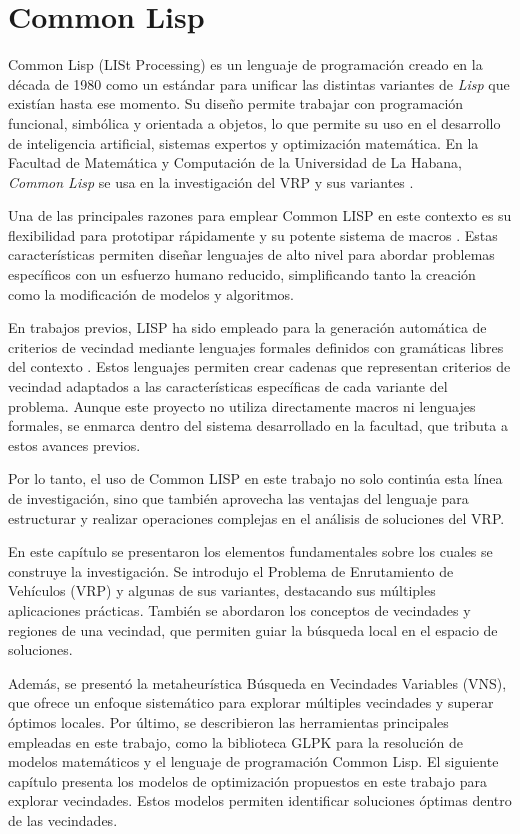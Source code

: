 \documentclass[12pt]{report}
\begin{document}
	\section{Common Lisp}
	\label{sec:lisp}

	Common Lisp (LISt Processing) es un lenguaje de programación creado en la década de 1980 como un estándar para unificar las distintas variantes de \textit{Lisp} que existían hasta ese momento. Su diseño permite trabajar con programación funcional, simbólica y orientada a objetos, lo que permite su uso en el desarrollo de inteligencia artificial, sistemas expertos y optimización matemática. En la Facultad de Matemática y Computación de la Universidad de La Habana, \textit{Common Lisp} se usa en la investigación del VRP y sus variantes \cite{ref3,ref4,ref5,ref6,ref18}.

	Una de las principales razones para emplear Common LISP en este contexto es su flexibilidad para prototipar rápidamente y su potente sistema de macros \cite{ref5}. Estas características permiten diseñar lenguajes de alto nivel para abordar problemas específicos con un esfuerzo humano reducido, simplificando tanto la creación como la modificación de modelos y algoritmos.

	En trabajos previos, LISP ha sido empleado para la generación automática de criterios de vecindad mediante lenguajes formales definidos con gramáticas libres del contexto \cite{ref18}. Estos lenguajes permiten crear cadenas que representan criterios de vecindad adaptados a las características específicas de cada variante del problema. Aunque este proyecto no utiliza directamente macros ni lenguajes formales, se enmarca dentro del sistema desarrollado en la facultad, que tributa a estos avances previos.

	Por lo tanto, el uso de Common LISP en este trabajo no solo continúa esta línea de investigación, sino que también aprovecha las ventajas del lenguaje para estructurar y realizar operaciones complejas en el análisis de soluciones del VRP.

    En este capítulo se presentaron los elementos fundamentales sobre los cuales se construye la investigación. Se introdujo el Problema de Enrutamiento de Vehículos (VRP) y algunas de sus variantes, destacando sus múltiples aplicaciones prácticas. También se abordaron los conceptos de vecindades y regiones de una vecindad, que permiten guiar la búsqueda local en el espacio de soluciones.

    Además, se presentó la metaheurística Búsqueda en Vecindades Variables (VNS), que ofrece un enfoque sistemático para explorar múltiples vecindades y superar óptimos locales. Por último, se describieron las herramientas principales empleadas en este trabajo, como la biblioteca GLPK para la resolución de modelos matemáticos y el lenguaje de programación Common Lisp. El siguiente capítulo presenta los modelos de optimización propuestos en este trabajo para explorar vecindades. Estos modelos permiten identificar soluciones óptimas dentro de las vecindades.

	
	
\end{document}

